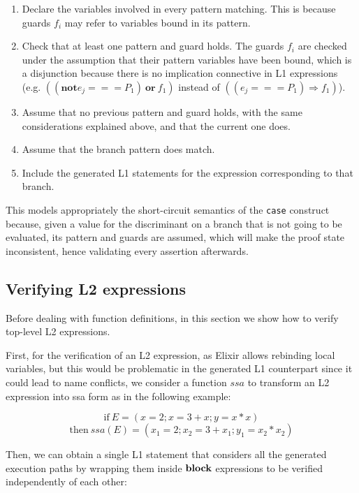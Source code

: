 \begin{enumerate}
  \item Declare the variables involved in every pattern matching. This is because guards $f_i$ may refer to variables bound in its pattern.
  \item Check that at least one pattern and guard holds. The guards $f_i$ are checked under the assumption that their pattern variables have been bound, which is a disjunction because there is no implication connective in L1 expressions (e.g. $((\mathbf{not} e_j === P_1)~\textbf{or}~f_1)$ instead of $((e_j === P_1) \Rightarrow f_1)$).
  \item Assume that no previous pattern and guard holds, with the same considerations explained above, and that the current one does.
  \item Assume that the branch pattern does match.
  \item Include the generated L1 statements for the expression corresponding to that branch.
\end{enumerate}

This models appropriately the short-circuit semantics of the \verb|case|
construct because, given a value for the discriminant on a branch that is not 
going to be evaluated, its pattern and guards are assumed, which will make the 
proof state inconsistent, hence validating every assertion afterwards.

\subsection{Verifying L2 expressions}
\label{sec:verificationprocess}

Before dealing with function definitions, in this section we show how to verify 
top-level L2 expressions.

First, for the verification of an L2 expression, as Elixir allows rebinding
local variables, but this would be problematic in the generated L1 counterpart
since it could lead to name conflicts, we consider a function $ssa$ to transform
an L2 expression into \gls{ssa} form \citep{rosen1988global} as in the following
example:

$$\text{if}~E =  (x = 2;x = 3 + x; y = x * x)$$
$$\text{then}~\mathit{ssa}(E) = (x_1 = 2;x_2 = 3 + x_1;y_1 = x_2 * x_2)$$

Then, we can obtain a single L1 statement that considers all the generated
execution paths by wrapping them inside $\textbf{block}$ expressions to be verified 
independently of each other:

